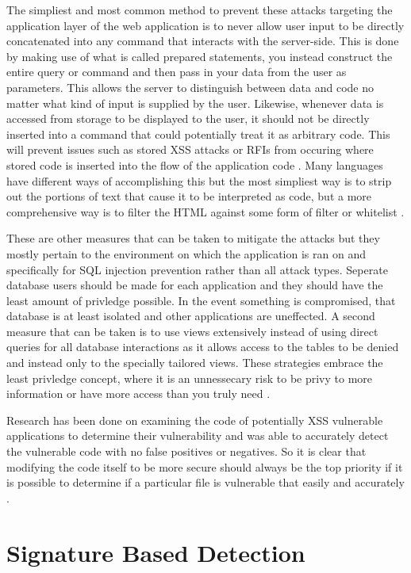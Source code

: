 The simpliest and most common method to prevent these attacks targeting the application layer of the web application is to never allow user input to be directly concatenated into any command that interacts with the server-side.  This is done by making use of what is called prepared statements, you instead construct the entire query or command and then pass in your data from the user as parameters.  This allows the server to distinguish between data and code no matter what kind of input is supplied by the user.  Likewise, whenever data is accessed from storage to be displayed to the user, it should not be directly inserted into a command that could potentially treat it as arbitrary code.  This will prevent issues such as stored XSS attacks or RFIs from occuring where stored code is inserted into the flow of the application code  \cite{owaspSQLPrevention}.  Many languages have different ways of accomplishing this but the most simpliest way is to strip out the portions of text that cause it to be interpreted as code, but a more comprehensive way is to filter the HTML against some form of filter or whitelist \cite{htmlPurifier}.

These are other measures that can be taken to mitigate the attacks but they mostly pertain to the environment on which the application is ran on and specifically for SQL injection prevention rather than all attack types.  Seperate database users should be made for each application and they should have the least amount of privledge possible.  In the event something is compromised, that database is at least isolated and other applications are uneffected.  A second measure that can be taken is to use views extensively instead of using direct queries for all database interactions as it allows access to the tables to be denied and instead only to the specially tailored views.  These strategies embrace the least privledge concept, where it is an unnessecary risk to be privy to more information or have more access than you truly need \cite{owaspSQLPrevention}.

Research has been done on examining the code of potentially XSS vulnerable applications to determine their vulnerability and was able to accurately detect the vulnerable code with no false positives or negatives.  So it is clear that modifying the code itself to be more secure should always be the top priority if it is possible to determine if a particular file is vulnerable that easily and accurately \cite{xssdm}.

\section{Signature Based Detection} \label{sec:sigDetection}

